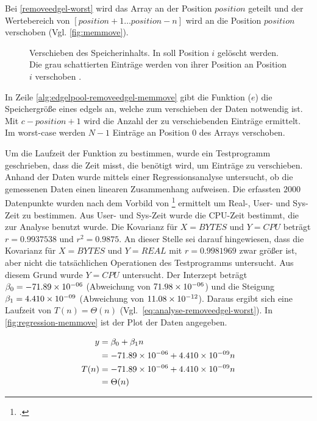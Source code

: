 Bei \autoref{removeedgel-worst} wird das Array an der Position $\mathit{position}$ geteilt und der Wertebereich von
 $[\mathit{position}+1 \dotsc \mathit{position}-n]$ wird an die Position $\mathit{position}$ verschoben
 (Vgl. \autoref{fig:memmove}).

\begin{figure}[!ht]
	\centering
	\subfigure[]{
		
		\label{fig:memmove-before}
	}
	\subfigure[]{
		
		\label{fig:memmove-after}
	}
	\caption{Verschieben des Speicherinhalts. In  soll Position $i$ gelöscht werden. Die
	 grau schattierten Einträge werden von ihrer Position an Position $i$ verschoben .}
	\label{fig:memmove}
\end{figure}

In Zeile \ref{alg:edgelpool-removeedgel-memmove} gibt die Funktion ($e$) die Speichergröße eines
 \glspl{edgel} an, welche zum verschieben der Daten notwendig ist. Mit $c - \mathit{position} + 1$ wird die Anzahl der
 zu verschiebenden Einträge ermittelt. Im worst-case werden $N-1$ Einträge an Position $0$ des Arrays verschoben.

Um die Laufzeit der Funktion  zu bestimmen, wurde ein Testprogramm geschrieben, dass die Zeit misst,
 die benötigt wird, um Einträge zu verschieben. Anhand der Daten wurde mittels einer Regressionsanalyse untersucht, ob
 die gemessenen Daten einen linearen Zusammenhang aufweisen. Die erfassten $2000$ Datenpunkte wurden nach dem Vorbild
 von \footcite{time-1} ermittelt um Real-, User- und Sys-Zeit zu bestimmen. Aus User- und Sys-Zeit wurde
 die CPU-Zeit bestimmt, die zur Analyse benutzt wurde. Die Kovarianz für $X = \mathit{BYTES}$ und $Y = \mathit{CPU}$
 beträgt $r = 0.9937538$ und $r^2 = 0.9875$. An dieser Stelle sei darauf hingewiesen, dass die Kovarianz für
 $X = \mathit{BYTES}$ und $Y = \mathit{REAL}$ mit $r = 0.9981969$ zwar größer ist, aber nicht die tatsächlichen
 Operationen des Testprogramms untersucht. Aus diesem Grund wurde $Y = \mathit{CPU}$ untersucht. Der Interzept beträgt
 $\beta_0 = -71.89\times 10^{-06}$ (Abweichung von $71.98\times 10^{-06}$) und die Steigung $\beta_1 = 4.410\times 10^{-09}$ (Abweichung von
 $11.08\times 10^{-12}$). Daraus ergibt sich eine Laufzeit von $T(n) =\Theta(n)$ (Vgl.~\autoref{eq:analyse-removeedgel-worst}).
 In \autoref{fig:regression-memmove} ist der Plot der Daten angegeben.

\begin{equation}
	\label{eq:analyse-removeedgel-worst}
	\begin{split}
		y& = \beta_0 + \beta_1n\\
		 & = -71.89\times 10^{-06} + 4.410\times 10^{-09}n\\
		T(n)& = -71.89\times 10^{-06} + 4.410\times 10^{-09}n\\
		 & = \Theta(n)
	\end{split}
\end{equation}

